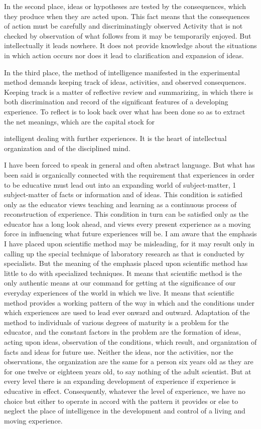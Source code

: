 In the second place, ideas or hypotheses are tested by the consequences, which they 
produce when they are acted upon. This fact means that the consequences of action must 
be carefully and discriminatingly observed Activity that is not checked by observation of 
what follows from it may be temporarily enjoyed. But intellectually it leads nowhere. It 
does not provide knowledge about the situations in which action occurs nor does it lead 
to clarification and expansion of ideas. 

In the third place, the method of intelligence manifested in the experimental method 
demands keeping track of ideas, activities, and observed consequences. Keeping track is 
a matter of reflective review and summarizing, in which there is both discrimination and 
record of the significant features of a developing experience. To reflect is to look back 
over what has been done so as to extract the net meanings, which are the capital stock for 



intelligent dealing with further experiences. It is the heart of intellectual organization and 
of the disciplined mind. 

I have been forced to speak in general and often abstract language. But what has been 
said is organically connected with the requirement that experiences in order to be 
educative must lead out into an expanding world of subject-matter, 1 subject-matter of 
facts or information and of ideas. This condition is satisfied only as the educator views 
teaching and learning as a continuous process of reconstruction of experience. This 
condition in turn can be satisfied only as the educator has a long look ahead, and views 
every present experience as a moving force in influencing what future experiences will 
be. I am aware that the emphasis I have placed upon scientific method may be 
misleading, for it may result only in calling up the special technique of laboratory 
research as that is conducted by specialists. But the meaning of the emphasis placed upon 
scientific method has little to do with specialized techniques. It means that scientific 
method is the only authentic means at our command for getting at the significance of our 
everyday experiences of the world in which we live. It means that scientific method 
provides a working pattern of the way in which and the conditions under which 
experiences are used to lead ever onward and outward. Adaptation of the method to 
individuals of various degrees of maturity is a problem for the educator, and the constant 
factors in the problem are the formation of ideas, acting upon ideas, observation of the 
conditions, which result, and organization of facts and ideas for future use. Neither the 
ideas, nor the activities, nor the observations, the organization are the same for a person 
six years old as they are for one twelve or eighteen years old, to say nothing of the adult 
scientist. But at every level there is an expanding development of experience if 
experience is educative in effect. Consequently, whatever the level of experience, we 
have no choice but either to operate in accord with the pattern it provides or else to 
neglect the place of intelligence in the development and control of a living and moving 
experience. 


